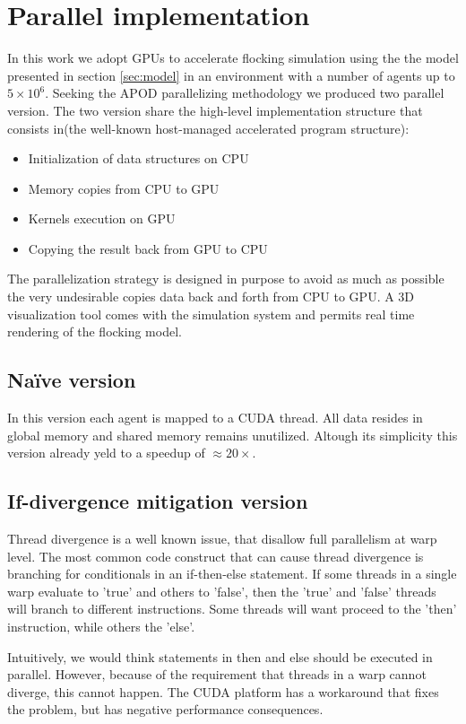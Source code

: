 \documentclass[journal,transmag]{IEEEtran}
\begin{document}
\section{Parallel implementation}
In this work we adopt GPUs to accelerate flocking simulation using the the model
presented in section \ref{sec:model} in an environment with a number of agents up to $5 \times10^6$.
Seeking the APOD parallelizing methodology we produced two parallel version.
The two version share the high-level implementation structure that consists
in(the well-known host-managed accelerated program structure): 
\begin{itemize}
	\item Initialization of data structures on CPU
	\item Memory copies from CPU to GPU
	\item Kernels execution on GPU
	\item Copying the result back from GPU to CPU
\end{itemize}
The parallelization strategy is designed in purpose to avoid as much
as possible the very undesirable copies data back and forth from CPU to GPU.
A 3D visualization tool comes with the simulation system and permits real time
rendering of the flocking model.

\subsection{Na\"{i}ve version}
In this version each agent is mapped to a CUDA thread. All data
resides in global memory and shared memory remains unutilized. Altough its simplicity this
version already yeld to a speedup of $\approx20 \times$. 


\subsection{If-divergence mitigation version}
Thread divergence is a well known issue, that disallow full parallelism at warp
level. The most common code construct that can cause thread divergence is
branching for conditionals in an if-then-else statement. If some threads in a single warp evaluate to 'true' and others to
'false', then the 'true' and 'false' threads will branch to different
instructions. Some threads will want proceed to the 'then' instruction, while
others the 'else'.

Intuitively, we would think statements in then and else should be executed in
parallel. However, because of the requirement that threads in a warp cannot
diverge, this cannot happen. The CUDA platform has a workaround that fixes the
problem, but has negative performance consequences.
\end{document}
